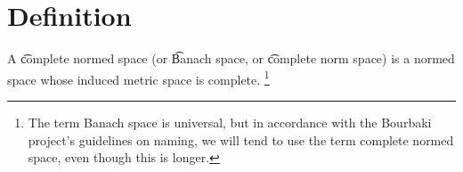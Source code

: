 
\section*{Definition}

A \t{complete normed space} (or \t{Banach space}, or \t{complete norm space}) is a normed space whose induced metric space is complete.
  \ifhmode\unskip\fi\footnote{
The term Banach space is universal, but in accordance with the Bourbaki project's guidelines on naming, we will tend to use the term complete normed space, even though this is longer.
  }

\blankpage